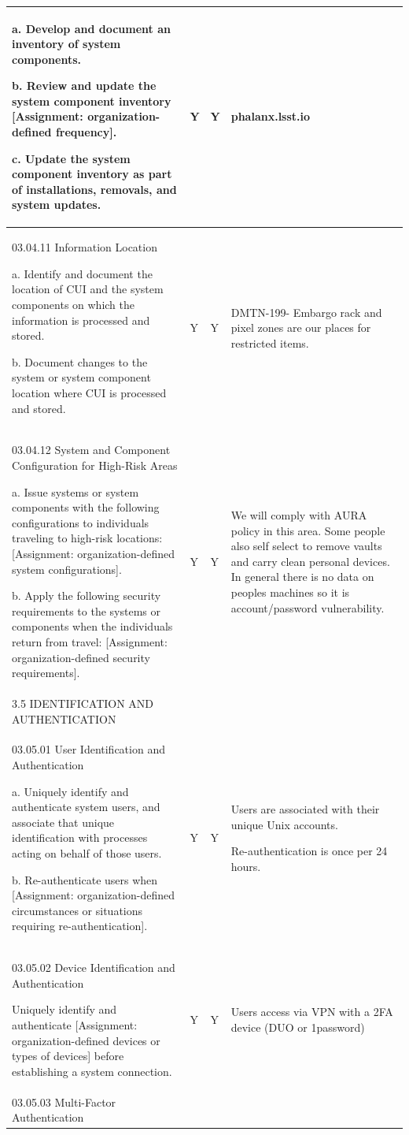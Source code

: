 \begin{longtable} {|p{}|p{}|p{}|p{} |}
{a. Develop and document an inventory of system components.

b. Review and update the system component inventory [Assignment: organization-
defined frequency].

c. Update the system component inventory as part of installations, removals, and
system updates.}&{Y}&{Y}&{phalanx.lsst.io} \\ \hline
{03.04.11 Information Location

a. Identify and document the location of CUI and the system components on which
the information is processed and stored.

b. Document changes to the system or system component location where CUI is
processed and stored.}&{Y}&{Y}&{DMTN-199- Embargo rack and pixel zones are our places for restricted items.} \\ \hline
{03.04.12 System and Component Configuration for High-Risk Areas

a. Issue systems or system components with the following configurations to
individuals traveling to high-risk locations: [Assignment: organization-defined
system configurations].

b. Apply the following security requirements to the systems or components when
the individuals return from travel: [Assignment: organization-defined security
requirements].}&{Y}&{Y}&{We will comply with AURA policy in this area. Some people also self select to remove vaults and carry clean personal devices. In general there is no data on peoples machines so it is account/password vulnerability.} \\ \hline
{3.5 IDENTIFICATION AND AUTHENTICATION}&&& \\ \hline
{03.05.01 User Identification and Authentication

a. Uniquely identify and authenticate system users, and associate that unique identification with processes acting on behalf of those users.

b. Re-authenticate users when [Assignment: organization-defined circumstances or situations requiring re-authentication].}&{Y}&{Y}&{Users are associated with their unique Unix accounts.

Re-authentication is once per 24 hours. } \\ \hline
{03.05.02 Device Identification and Authentication

Uniquely identify and authenticate [Assignment: organization-defined devices or
types of devices] before establishing a system connection.}&{Y}&{Y}&{Users access via VPN with a 2FA device (DUO or 1password)} \\ \hline
{03.05.03 Multi-Factor Authentication

}
\end{longtable}
